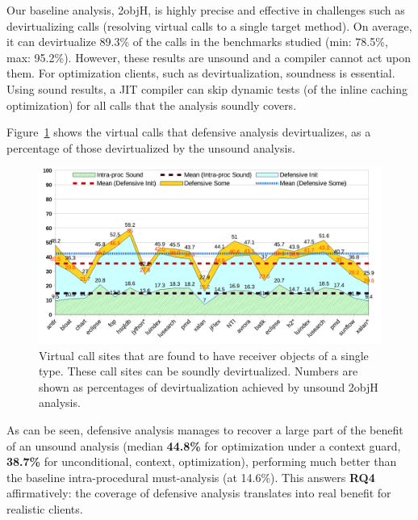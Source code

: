 Our baseline analysis, 2objH, is highly precise and effective in challenges such as devirtualizing calls (resolving virtual calls to a single target method). On average, it can devirtualize 89.3\% of the calls in the benchmarks studied (min: 78.5\%, max: 95.2\%). However, these results are unsound and a compiler cannot act upon them. For optimization clients, such as devirtualization, soundness is essential. Using sound results, a JIT compiler can skip dynamic tests (of the inline caching optimization) for all calls that the analysis soundly covers.

Figure~\ref{fig:sound:devirt1} shows the virtual calls that defensive analysis devirtualizes, as a percentage of those devirtualized by the unsound analysis.

\begin{figure}[tbh]
\centering
\includegraphics[width=\linewidth]{assets/defensive/devirt1.pdf}
\caption{Virtual call sites that are found to have receiver objects of a single type. These call sites can be soundly devirtualized. Numbers are shown as percentages of devirtualization achieved by unsound 2objH analysis.}
\label{fig:sound:devirt1}
\end{figure}

As can be seen, defensive analysis manages to recover a large part of the benefit of an unsound analysis (median \textbf{44.8\%} for optimization under a context guard, \textbf{38.7\%} for unconditional, \ctxInit{} context, optimization), performing much better than the baseline intra-procedural must-analysis (at 14.6\%). This answers \textbf{RQ4} affirmatively: the coverage of defensive analysis translates into real benefit for realistic clients.


